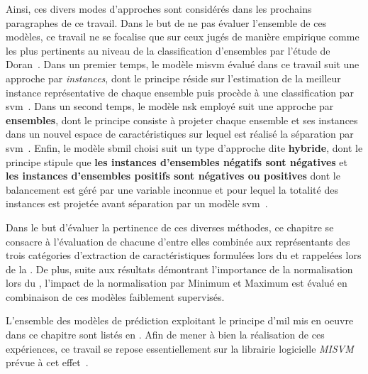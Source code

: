 Ainsi, ces divers modes d'approches sont considérés dans les prochains paragraphes de ce travail. Dans le but de ne pas évaluer l'ensemble de ces modèles, ce travail ne se focalise que sur ceux jugés de manière empirique comme les plus pertinents au niveau de la classification d'ensembles par l'étude de Doran~. Dans un premier temps, le modèle \gls{misvm} évalué dans ce travail suit une approche par \textit{instances}, dont le principe réside sur l'estimation de la meilleur instance représentative de chaque ensemble puis procède à une classification par \gls{svm}~\cite{Andrews2003}. Dans un second temps, le modèle \gls{nsk} employé suit une approche par \textbf{ensembles}, dont le principe consiste à projeter chaque ensemble et ses instances dans un nouvel espace de caractéristiques sur lequel est réalisé la séparation par \gls{svm}~\cite{Gartner2002}. Enfin, le modèle \gls{sbmil} choisi suit un type d'approche dite \textbf{hybride}, dont le principe stipule que \textbf{les instances d'ensembles négatifs sont négatives} et \textbf{les instances d'ensembles positifs sont négatives ou positives} dont le balancement est géré par une variable inconnue et pour lequel la totalité des instances est projetée avant séparation par un modèle \gls{svm}~\cite{Bunescu2007}.\par

Dans le but d'évaluer la pertinence de ces diverses méthodes, ce chapitre se consacre à l'évaluation de chacune d'entre elles combinée aux représentants des trois catégories d'extraction de caractéristiques formulées lors du  et rappelées lors de la . De plus, suite aux résultats démontrant l'importance de la normalisation lors du , l'impact de la normalisation par Minimum et Maximum est évalué en combinaison de ces modèles faiblement supervisés.\par

L'ensemble des modèles de prédiction exploitant le principe d'\gls{mil} mis en oeuvre dans ce chapitre sont listés en . Afin de mener à bien la réalisation de ces expériences, ce travail se repose essentiellement sur la librairie logicielle \textit{MISVM} prévue à cet effet~\cite{Doran2013}.\par

